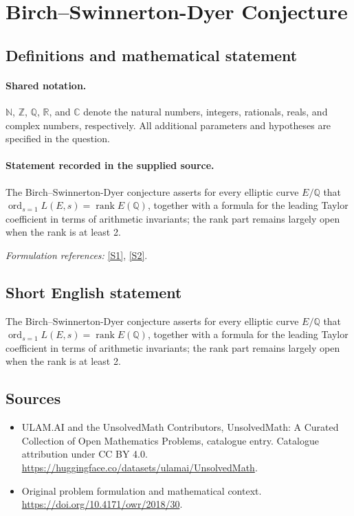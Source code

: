 \documentclass[11pt]{article}
\newcommand{\sref}[2]{\hyperlink{source:#1:#2}{[S#2]}}
\begin{document}
\section{Birch–Swinnerton-Dyer Conjecture}\label{statement}

\subsection{Definitions and mathematical statement}

\paragraph{Shared notation.}$\mathbb N$, $\mathbb Z$, $\mathbb Q$, $\mathbb R$, and $\mathbb C$ denote the natural numbers, integers, rationals, reals, and complex numbers, respectively. All additional parameters and hypotheses are specified in the question.


\paragraph{Statement recorded in the supplied source.}
The Birch–Swinnerton-Dyer conjecture asserts for every elliptic curve $E/\mathbb{Q}$ that $\operatorname{ord}_{s=1}L(E,s)=\operatorname{rank}E(\mathbb{Q})$, together with a formula for the leading Taylor coefficient in terms of arithmetic invariants; the rank part remains largely open when the rank is at least 2.
\par\smallskip\textit{Formulation references:} \sref{statement}{1}, \sref{statement}{2}.
\subsection{Short English statement}
The Birch–Swinnerton-Dyer conjecture asserts for every elliptic curve $E/\mathbb{Q}$ that $\operatorname{ord}_{s=1}L(E,s)=\operatorname{rank}E(\mathbb{Q})$, together with a formula for the leading Taylor coefficient in terms of arithmetic invariants; the rank part remains largely open when the rank is at least 2.
\subsection{Sources}
\begin{itemize}
\item[\hypertarget{source:statement:1}{S1}] ULAM.AI and the UnsolvedMath Contributors, UnsolvedMath: A Curated Collection of Open Mathematics Problems, catalogue entry. Catalogue attribution under CC BY 4.0.
\url{https://huggingface.co/datasets/ulamai/UnsolvedMath}.
\item[\hypertarget{source:statement:2}{S2}] Original problem formulation and mathematical context.
\url{https://doi.org/10.4171/owr/2018/30}.
\end{itemize}
\label{end:statement}
\end{document}
